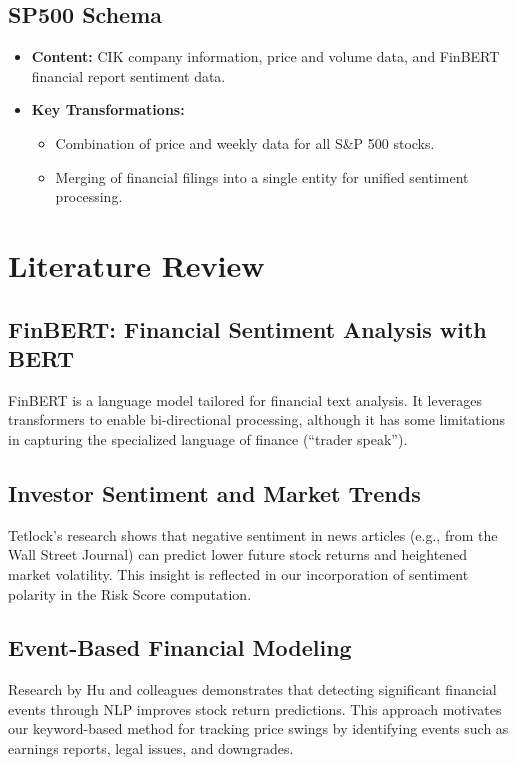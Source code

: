 \documentclass[twocolumn]{article}
\begin{document}
\subsection{SP500 Schema}
\begin{itemize}
    \item \textbf{Content:} CIK company information, price and volume data, and FinBERT financial report sentiment data.
    \item \textbf{Key Transformations:}
    \begin{itemize}
        \item Combination of price and weekly data for all S\&P 500 stocks.
        \item Merging of financial filings into a single entity for unified sentiment processing.
    \end{itemize}
\end{itemize}

\section{Literature Review}
\subsection{FinBERT: Financial Sentiment Analysis with BERT}
FinBERT is a language model tailored for financial text analysis. It leverages transformers to enable bi-directional processing, although it has some limitations in capturing the specialized language of finance (“trader speak”).

\subsection{Investor Sentiment and Market Trends}
Tetlock’s research shows that negative sentiment in news articles (e.g., from the Wall Street Journal) can predict lower future stock returns and heightened market volatility. This insight is reflected in our incorporation of sentiment polarity in the Risk Score computation.

\subsection{Event-Based Financial Modeling}
Research by Hu and colleagues demonstrates that detecting significant financial events through NLP improves stock return predictions. This approach motivates our keyword-based method for tracking price swings by identifying events such as earnings reports, legal issues, and downgrades.
\end{document}
